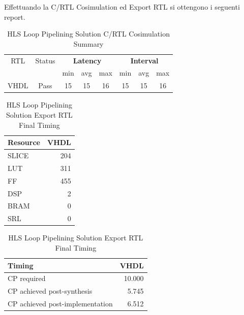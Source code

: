 Effettuando la C/RTL Cosimulation ed Export RTL si ottengono i seguenti report.

\begin{table}[H]
    \centering
    \begin{tabular}{|c|c|c|c|c|c|c|c|}
        \hline
        \multicolumn{1}{|c|}{RTL} & \multicolumn{1}{|c|}{Status} & \multicolumn{3}{c|}{\textbf{Latency}} & \multicolumn{3}{c|}{\textbf{Interval}} \\
        &  & min & avg & max & min & avg & max \\
        \hline
        VHDL & Pass & 15 & 15 & 16 & 15 & 15 & 16 \\
        \hline
    \end{tabular}
    \caption{HLS Loop Pipelining Solution C/RTL Cosimulation Summary }
    \label{tab:hls-loop-pipelining-solution-cosimulation-summary}
\end{table}

\begin{table}[H]
    \centering
    \begin{minipage}[t]{0.45\linewidth}
        \centering
        \begin{tabular}{|l|r|}
            \hline
            \textbf{Resource} & \textbf{VHDL} \\
            \hline
            SLICE & 204 \\
            \hline
            LUT & 311 \\
            \hline
            FF & 455 \\
            \hline
            DSP & 2 \\
            \hline
            BRAM & 0 \\
            \hline
            SRL & 0 \\
            \hline
        \end{tabular}
        \caption{HLS Loop Pipelining Solution Export RTL Resource Usage}
        \label{tab:hls-loop-pipelining-solution-export-rtl-resoruce-usage}
    \end{minipage}
    \hfill
    \begin{minipage}[t]{0.45\linewidth}
        \centering
        \begin{tabular}{|l|r|}
            \hline
            \textbf{Timing} & \textbf{VHDL} \\
            \hline
            CP required & 10.000 \\
            \hline
            CP achieved post-synthesis & 5.745 \\
            \hline
            CP achieved post-implementation & 6.512 \\
            \hline
        \end{tabular}
        \caption{HLS Loop Pipelining Solution Export RTL Final Timing}
        \label{tab:hls-loop-pipelining-solution-export-rtl-final-timing}
    \end{minipage}
\end{table}

